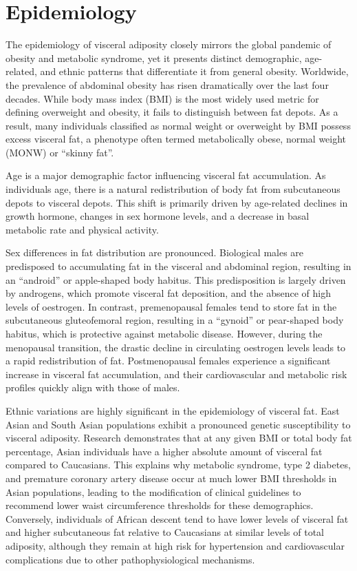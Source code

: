 \section*{Epidemiology}
The epidemiology of visceral adiposity closely mirrors the global pandemic of obesity and metabolic syndrome, yet it presents distinct demographic, age-related, and ethnic patterns that differentiate it from general obesity. Worldwide, the prevalence of abdominal obesity has risen dramatically over the last four decades. While body mass index (BMI) is the most widely used metric for defining overweight and obesity, it fails to distinguish between fat depots. As a result, many individuals classified as normal weight or overweight by BMI possess excess visceral fat, a phenotype often termed metabolically obese, normal weight (MONW) or ``skinny fat''.

Age is a major demographic factor influencing visceral fat accumulation. As individuals age, there is a natural redistribution of body fat from subcutaneous depots to visceral depots. This shift is primarily driven by age-related declines in growth hormone, changes in sex hormone levels, and a decrease in basal metabolic rate and physical activity.

Sex differences in fat distribution are pronounced. Biological males are predisposed to accumulating fat in the visceral and abdominal region, resulting in an ``android'' or apple-shaped body habitus. This predisposition is largely driven by androgens, which promote visceral fat deposition, and the absence of high levels of oestrogen. In contrast, premenopausal females tend to store fat in the subcutaneous gluteofemoral region, resulting in a ``gynoid'' or pear-shaped body habitus, which is protective against metabolic disease. However, during the menopausal transition, the drastic decline in circulating oestrogen levels leads to a rapid redistribution of fat. Postmenopausal females experience a significant increase in visceral fat accumulation, and their cardiovascular and metabolic risk profiles quickly align with those of males.

Ethnic variations are highly significant in the epidemiology of visceral fat. East Asian and South Asian populations exhibit a pronounced genetic susceptibility to visceral adiposity. Research demonstrates that at any given BMI or total body fat percentage, Asian individuals have a higher absolute amount of visceral fat compared to Caucasians. This explains why metabolic syndrome, type 2 diabetes, and premature coronary artery disease occur at much lower BMI thresholds in Asian populations, leading to the modification of clinical guidelines to recommend lower waist circumference thresholds for these demographics. Conversely, individuals of African descent tend to have lower levels of visceral fat and higher subcutaneous fat relative to Caucasians at similar levels of total adiposity, although they remain at high risk for hypertension and cardiovascular complications due to other pathophysiological mechanisms.

